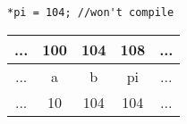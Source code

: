 \documentclass{beamer}
\begin{document}
\begin{frame}[fragile]
\begin{columns}[t]
\begin{column}{0.5\textwidth}
\begin{center}
\begin{tabular}{c | c | c | c | c}
\end{tabular}
\end{center}

\pause

\begin{flushleft}
\begin{lstlisting}
*pi = 104; //won't compile
\end{lstlisting}
\end{flushleft}

\begin{center}
  
\pause

\begin{tabular}{c | c | c | c | c}
... & 100 & 104 & 108 & ...\\\hline
... & a   & b   & pi  & ... \\\hline
... & 10  & \alert{104}   & 104 & ... \\
  
\end{tabular}
\end{center}
  \end{column}
\end{columns}



\end{frame}
\end{document}
